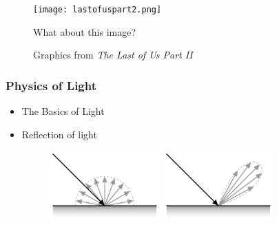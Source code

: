 \documentclass[12pt]{beamer}
\begin{document}
  \begin{frame}
    \begin{figure}
      \centering
      \texttt{[image: lastofuspart2.png]}
      \caption{Graphics from \textit{The Last of Us Part II}}\label{tlou2}

      What about this image?
    \end{figure}
  \end{frame}




  \begin{frame}
    \frametitle{Physics of Light}
    \begin{itemize}
      \item The Basics of Light
      \item Reflection of light %
      \begin{figure}
        \includegraphics[width=0.4\textwidth]{diffuse}
        \includegraphics[width=0.4\textwidth]{specular}

\end{figure}
\end{itemize}
\end{frame}
\end{document}
